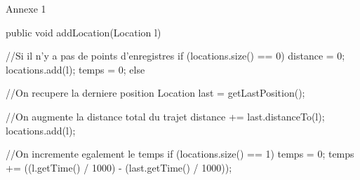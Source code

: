{\Huge{Annexe 1}}
\label{Annexe1}
\begin{java}  
public void addLocation(Location l) {
	//Si il n'y a pas de points d'enregistres
	if (locations.size() == 0) {
		distance = 0;
		locations.add(l);
		temps = 0;
	} else {
	
	//On recupere la derniere position 
	Location last = getLastPosition();
	
	//On augmente la distance total du trajet 
	distance += last.distanceTo(l);
	locations.add(l);
 	
 	//On incremente egalement le temps 
	if (locations.size() == 1) {
		temps = 0;
	} 
	temps += ((l.getTime() / 1000) - (last.getTime() / 1000));   
	}
}
\end{java}